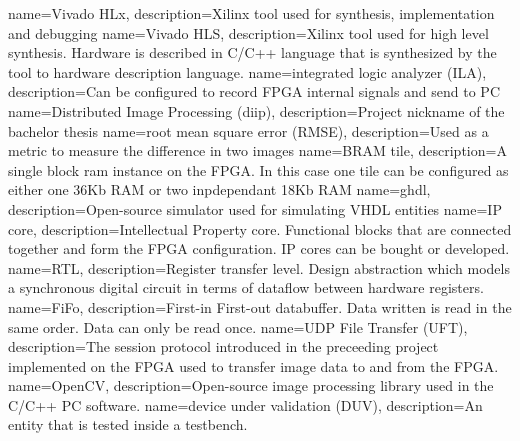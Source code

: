%
%
{
    name=Vivado HLx,
    description={Xilinx tool used for synthesis, implementation and debugging}
}
{
    name=Vivado HLS,
    description={Xilinx tool used for high level synthesis. Hardware is
    described in C/C++ language that is synthesized by the tool to hardware
    description language.}
}
{
    name=integrated logic analyzer (ILA),
    description={Can be configured to record FPGA internal signals and send to PC}
}
{
    name=Distributed Image Processing (diip),
    description={Project nickname of the bachelor thesis}
}
{
    name=root mean square error (RMSE),
    description={Used as a metric to measure the difference in two images}
}
{
    name=BRAM tile,
    description={A single block ram instance on the FPGA. In this case one tile
    can be configured as either one 36Kb RAM or two inpdependant 18Kb RAM}
}
{
    name=ghdl,
    description={Open-source simulator used for simulating VHDL entities}
}
{
    name=IP core,
    description={Intellectual Property core. Functional blocks that are
    connected together and form the FPGA configuration. IP cores can be bought
    or developed.}
}
{
    name=RTL,
    description={Register transfer level. Design abstraction which models a
    synchronous digital circuit in terms of dataflow between hardware
    registers.}
}
{
    name=FiFo,
    description={First-in First-out databuffer. Data written is read in the
    same order. Data can only be read once.}
}
{
    name=UDP File Transfer (UFT),
    description={The session protocol introduced in the preceeding project
    implemented on
    the FPGA used to transfer image data to and from the FPGA.}
}
{
    name=OpenCV,
    description={Open-source image processing library used in the C/C++ PC
    software.}
}
{
    name=device under validation (DUV),
    description={An entity that is tested inside a testbench.}
}